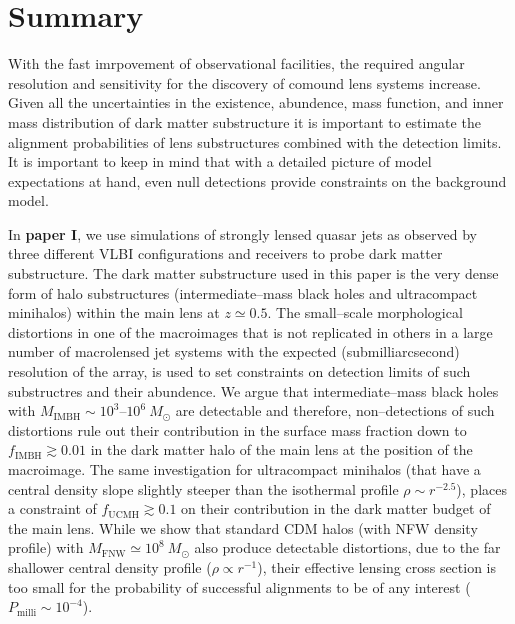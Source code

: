 \documentclass[paper=a4, fontsize=11pt]{scrartcl} %
\numberwithin{equation}{section} %
\numberwithin{figure}{section} %
\numberwithin{table}{section} %
\begin{document}


\newpage
\section{Summary}
With the fast imrpovement of observational facilities, the required angular resolution and sensitivity for the discovery of comound lens systems increase. Given all the uncertainties in the existence, abundence, mass function, and inner mass distribution of dark matter substructure it is important to estimate the alignment probabilities of lens substructures combined with the detection limits. It is important to keep in mind that with a detailed picture of model expectations at hand, even null detections provide constraints on the background model.

In {\bf paper I}, we use simulations of strongly lensed quasar jets as observed by three different VLBI configurations and receivers to probe dark matter substructure. The dark matter substructure used in this paper is the very dense form of halo substructures (intermediate--mass black holes and ultracompact minihalos) within the main lens at $z \simeq 0.5$. The small--scale morphological distortions in one of the macroimages that is not replicated in others in a large number of macrolensed jet systems with the expected (submilliarcsecond) resolution of the array, is used to set constraints on detection limits of such substructres and their abundence. We argue that intermediate--mass black holes with $M_\mathrm{IMBH} \sim 10^3$--$10^6\ M_\odot$ are detectable and therefore, non--detections of such distortions rule out their contribution in the surface mass fraction down to $f_\mathrm{IMBH}\gtrsim 0.01$ in the dark matter halo of the main lens at the position of the macroimage. The same investigation for ultracompact minihalos (that have a central density slope slightly steeper than the isothermal profile $\rho\sim r^{-2.5}$), places a constraint of $f_\mathrm{UCMH}\gtrsim 0.1$ on their contribution in the dark matter budget of the main lens. While we show that standard CDM halos (with NFW density profile) with $M_\mathrm{FNW} \simeq 10^8\ M_\odot$ also produce detectable distortions, due to the far shallower central density profile ($\rho \propto r^{-1}$), their effective lensing cross section is too small for the probability of successful alignments to be of any interest ($P_\mathrm{milli}\sim 10^{-4}$).
\end{document}
